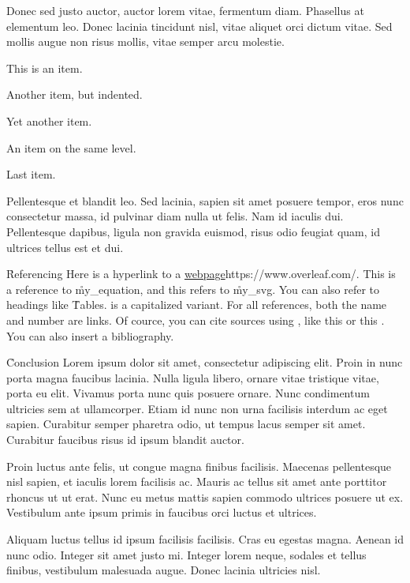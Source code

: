 \documentclass{ieee}
\begin{document}
Donec sed justo auctor, auctor lorem vitae, fermentum diam. Phasellus at elementum leo. Donec lacinia tincidunt nisl, vitae aliquet orci dictum vitae. Sed mollis augue non risus mollis, vitae semper arcu molestie.

    \begin{numbers}
        \item This is an item.
        \begin{numbers}
            \item Another item, but indented.
            \begin{numbers}
                \item Yet another item.
                \item An item on the same level.
            \end{numbers}
        \end{numbers}
        \item Last item.
    \end{numbers}

Pellentesque et blandit leo. Sed lacinia, sapien sit amet posuere tempor, eros nunc consectetur massa, id pulvinar diam nulla ut felis. Nam id iaculis dui. Pellentesque dapibus, ligula non gravida euismod, risus odio feugiat quam, id ultrices tellus est et dui.

\h{Referencing}
Here is a hyperlink to a \url{webpage}{https://www.overleaf.com/}. This is a reference to \r{my_equation}, and this refers to \r{my_svg}. You can also refer to headings like \r{Tables}.  is a capitalized variant. For all references, both the name and number are links. Of cource, you can cite sources using \c{\cite{...}}, like this \cite{minted} or this \cite{tabularray}. You can also insert a bibliography.

\h{Conclusion}
Lorem ipsum dolor sit amet, consectetur adipiscing elit. Proin in nunc porta magna faucibus lacinia. Nulla ligula libero, ornare vitae tristique vitae, porta eu elit. Vivamus porta nunc quis posuere ornare. Nunc condimentum ultricies sem at ullamcorper. Etiam id nunc non urna facilisis interdum ac eget sapien. Curabitur semper pharetra odio, ut tempus lacus semper sit amet. Curabitur faucibus risus id ipsum blandit auctor.

Proin luctus ante felis, ut congue magna finibus facilisis. Maecenas pellentesque nisl sapien, et iaculis lorem facilisis ac. Mauris ac tellus sit amet ante porttitor rhoncus ut ut erat. Nunc eu metus mattis sapien commodo ultrices posuere ut ex. Vestibulum ante ipsum primis in faucibus orci luctus et ultrices.

Aliquam luctus tellus id ipsum facilisis facilisis. Cras eu egestas magna. Aenean id nunc odio. Integer sit amet justo mi. Integer lorem neque, sodales et tellus finibus, vestibulum malesuada augue. Donec lacinia ultricies nisl.

\toc

\end{document}
